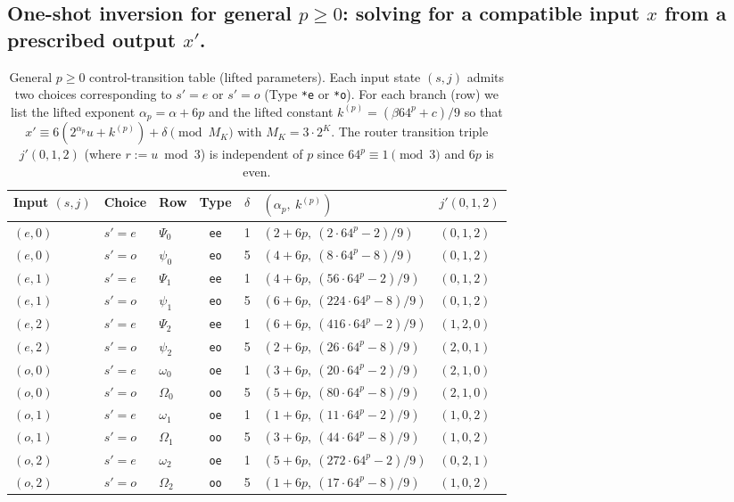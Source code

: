 \documentclass[11pt,letterpaper]{amsart}
\theoremstyle{definition}
\theoremstyle{plain}
\theoremstyle{plain}
\theoremstyle{remark}
\begin{document}
\subsection{One-shot inversion for general $p\ge 0$: solving for a compatible input $x$ from a prescribed output $x'$.}

\begin{table}[H]
\centering
\small
\setlength{\tabcolsep}{4pt}
\renewcommand{\arraystretch}{1.12}

\caption{General $p\ge 0$ control-transition table (lifted parameters).  Each input state $(s,j)$ admits two choices
corresponding to $s'=e$ or $s'=o$ (Type \texttt{*e} or \texttt{*o}).  For each branch (row) we list the lifted exponent
$\alpha_p=\alpha+6p$ and the lifted constant $k^{(p)}=(\beta 64^p + c)/9$ so that
$x'\equiv 6(2^{\alpha_p}u+k^{(p)})+\delta \pmod{M_K}$ with $M_K=3\cdot 2^K$.
The router transition triple $j'(0,1,2)$ (where $r:=u\bmod 3$) is independent of $p$ since $64^p\equiv 1\pmod 3$ and $6p$ is even.}
\label{tab:control-transitions-general-p}

\begin{adjustbox}{max width=\linewidth}
\begin{tabular}{lllccll}
\toprule
Input $(s,j)$ & Choice & Row & Type & $\delta$ & $(\alpha_p,\ k^{(p)})$ & $j'(0,1,2)$ \\
\midrule
$(e,0)$ & $s'=e$ & $\Psi_{0}$ & \texttt{ee} & 1 & $(2+6p,\ (2\cdot 64^p-2)/9)$   & $(0,1,2)$ \\
$(e,0)$ & $s'=o$ & $\psi_{0}$ & \texttt{eo} & 5 & $(4+6p,\ (8\cdot 64^p-8)/9)$   & $(0,1,2)$ \\
\midrule
$(e,1)$ & $s'=e$ & $\Psi_{1}$ & \texttt{ee} & 1 & $(4+6p,\ (56\cdot 64^p-2)/9)$  & $(0,1,2)$ \\
$(e,1)$ & $s'=o$ & $\psi_{1}$ & \texttt{eo} & 5 & $(6+6p,\ (224\cdot 64^p-8)/9)$ & $(0,1,2)$ \\
\midrule
$(e,2)$ & $s'=e$ & $\Psi_{2}$ & \texttt{ee} & 1 & $(6+6p,\ (416\cdot 64^p-2)/9)$ & $(1,2,0)$ \\
$(e,2)$ & $s'=o$ & $\psi_{2}$ & \texttt{eo} & 5 & $(2+6p,\ (26\cdot 64^p-8)/9)$  & $(2,0,1)$ \\
\midrule
$(o,0)$ & $s'=e$ & $\omega_{0}$ & \texttt{oe} & 1 & $(3+6p,\ (20\cdot 64^p-2)/9)$  & $(2,1,0)$ \\
$(o,0)$ & $s'=o$ & $\Omega_{0}$ & \texttt{oo} & 5 & $(5+6p,\ (80\cdot 64^p-8)/9)$  & $(2,1,0)$ \\
\midrule
$(o,1)$ & $s'=e$ & $\omega_{1}$ & \texttt{oe} & 1 & $(1+6p,\ (11\cdot 64^p-2)/9)$  & $(1,0,2)$ \\
$(o,1)$ & $s'=o$ & $\Omega_{1}$ & \texttt{oo} & 5 & $(3+6p,\ (44\cdot 64^p-8)/9)$  & $(1,0,2)$ \\
\midrule
$(o,2)$ & $s'=e$ & $\omega_{2}$ & \texttt{oe} & 1 & $(5+6p,\ (272\cdot 64^p-2)/9)$ & $(0,2,1)$ \\
$(o,2)$ & $s'=o$ & $\Omega_{2}$ & \texttt{oo} & 5 & $(1+6p,\ (17\cdot 64^p-8)/9)$  & $(1,0,2)$ \\
\bottomrule
\end{tabular}
\end{adjustbox}
\end{table}
\end{document}
